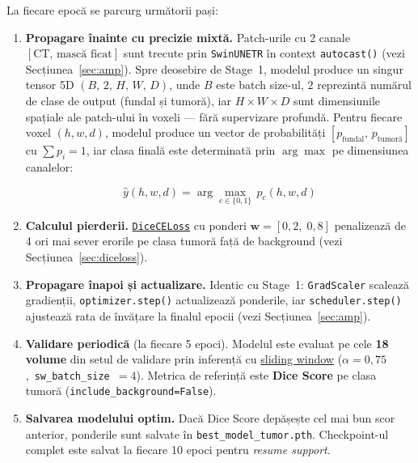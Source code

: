 \documentclass[12pt, a4paper]{report}
\begin{document}
La fiecare epocă se parcurg următorii pași:

\begin{enumerate}
    \item \textbf{Propagare înainte cu precizie mixtă.}
    Patch-urile cu 2 canale $[\text{CT},\, \text{mască ficat}]$
    sunt trecute prin \texttt{SwinUNETR} în context
    \texttt{autocast()}
    (vezi Secțiunea~\ref{sec:amp}).
    Spre deosebire de Stage~1, modelul produce un singur tensor 5D
$(B,\, 2,\, H,\, W,\, D)$, unde $B$ este batch size-ul, $2$
reprezintă numărul de clase de output (fundal și tumoră), iar
$H \times W \times D$ sunt dimensiunile spațiale ale patch-ului
în voxeli — fără supervizare profundă. Pentru fiecare voxel
$(h, w, d)$, modelul produce un vector de probabilități
$[p_{\text{fundal}},\, p_{\text{tumoră}}]$ cu $\sum p_i = 1$,
iar clasa finală este determinată prin $\arg\max$ pe dimensiunea
canalelor:

\begin{equation}
    \hat{y}(h,w,d) = \arg\max_{c \in \{0,1\}}
    \, p_c(h,w,d)
\end{equation}


    \item \textbf{Calculul pierderii.}
    \hyperref[sec:diceceloss]{\texttt{DiceCELoss}} cu ponderi
    $\mathbf{w} = [0{,}2,\; 0{,}8]$ penalizează de 4 ori mai
    sever erorile pe clasa tumoră față de background
    (vezi Secțiunea~\ref{sec:diceloss}).

    \item \textbf{Propagare înapoi și actualizare.}
    Identic cu Stage~1: \texttt{GradScaler} scalează gradienții,
    \texttt{optimizer.step()} actualizează ponderile, iar
    \texttt{scheduler.step()} ajustează rata de învățare la
    finalul epocii
    (vezi Secțiunea~\ref{sec:amp}).

    \item \textbf{Validare periodică} (la fiecare 5 epoci).
    Modelul este evaluat pe cele \textbf{18 volume} din setul
    de validare prin inferență cu
    \hyperref[sec:overlap]{sliding window}
    ($\alpha = 0{,}75$,\ \texttt{sw\_batch\_size}~$= 4$).
    Metrica de referință este \textbf{Dice Score} pe clasa
    tumoră (\texttt{include\_background=False}).

    \item \textbf{Salvarea modelului optim.}
    Dacă Dice Score depășește cel mai bun scor anterior,
    ponderile sunt salvate în \texttt{best\_model\_tumor.pth}.
    Checkpoint-ul complet este salvat la fiecare 10 epoci
    pentru \textit{resume support}.
\end{enumerate}
\end{document}
